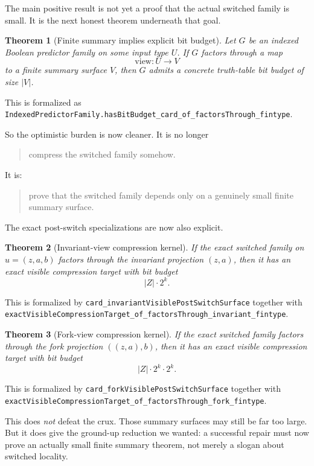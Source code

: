 \documentclass[11pt]{article}
\newtheorem{theorem}{Theorem}[section]
\theoremstyle{remark}
\begin{document}
The main positive result is not yet a proof that the actual switched family is
small.  It is the next honest theorem underneath that goal.

\begin{theorem}[Finite summary implies explicit bit budget]
Let \(G\) be an indexed Boolean predictor family on some input type \(U\).  If
\(G\) factors through a map
\[
  \mathrm{view} : U \to V
\]
to a finite summary surface \(V\), then \(G\) admits a concrete truth-table bit
budget of size \(|V|\).
\end{theorem}

\noindent
This is formalized as
\texttt{IndexedPredictorFamily.hasBitBudget\_card\_of\_factorsThrough\_fintype}.

So the optimistic burden is now cleaner.  It is no longer
\begin{quote}
compress the switched family somehow.
\end{quote}
It is:
\begin{quote}
prove that the switched family depends only on a genuinely small finite summary
surface.
\end{quote}

The exact post-switch specializations are now also explicit.

\begin{theorem}[Invariant-view compression kernel]
If the exact switched family on \(u=(z,a,b)\) factors through the invariant
projection \((z,a)\), then it has an exact visible compression target with bit
budget
\[
  |Z| \cdot 2^k.
\]
\end{theorem}

\noindent
This is formalized by
\texttt{card\_invariantVisiblePostSwitchSurface} together with
\texttt{exactVisibleCompressionTarget\_of\_factorsThrough\_invariant\_fintype}.

\begin{theorem}[Fork-view compression kernel]
If the exact switched family factors through the fork projection
\(((z,a),b)\), then it has an exact visible compression target with bit budget
\[
  |Z| \cdot 2^k \cdot 2^k.
\]
\end{theorem}

\noindent
This is formalized by
\texttt{card\_forkVisiblePostSwitchSurface} together with
\texttt{exactVisibleCompressionTarget\_of\_factorsThrough\_fork\_fintype}.

This does \emph{not} defeat the crux.  Those summary surfaces may still be far
too large.  But it does give the ground-up reduction we wanted: a successful
repair must now prove an actually small finite summary theorem, not merely a
slogan about switched locality.
\end{document}
